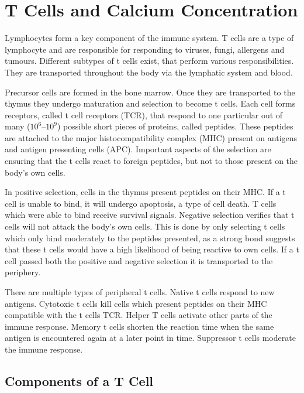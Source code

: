 \chapter{T Cells and Calcium Concentration}
\label{chapter:t-cell}

Lymphocytes form a key component of the immune system. T cells are a type of lymphocyte and are responsible for responding to viruses, fungi, allergens and tumours. Different subtypes of t cells exist, that perform various responsibilities. They are transported throughout the body via the lymphatic system and blood.\cite{Kumar2018}

Precursor cells are formed in the bone marrow. Once they are transported to the thymus they undergo maturation and selection to become t cells. Each cell forms receptors, called t cell receptors (TCR), that respond to one particular out of many ($10^6 – 10^9$) possible short pieces of proteins, called peptides. These peptides are attached to the major histocompatibility complex (MHC) present on antigens and antigen presenting cells (APC). Important aspects of the selection are ensuring that the t cells react to foreign peptides, but not to those present on the body's own cells.\cite{Ashby2024}

In positive selection, cells in the thymus present peptides on their MHC. If a t cell is unable to bind, it will undergo apoptosis, a type of cell death. T cells which were able to bind receive survival signals. Negative selection verifies that t cells will not attack the body's own cells. This is done by only selecting t cells which only bind moderately to the peptides presented, as a strong bond suggests that these t cells would have a high likelihood of being reactive to own cells.\cite{Hagel2018} If a t cell passed both the positive and negative selection it is transported to the periphery.

There are multiple types of peripheral t cells. Native t cells respond to new antigens. Cytotoxic t cells kill cells which present peptides on their MHC compatible with the t cells TCR. Helper T cells activate other parts of the immune response. Memory t cells shorten the reaction time when the same antigen is encountered again at a later point in time. Suppressor t cells moderate the immune response.\cite{Ganong1997}

\section{Components of a T Cell}

